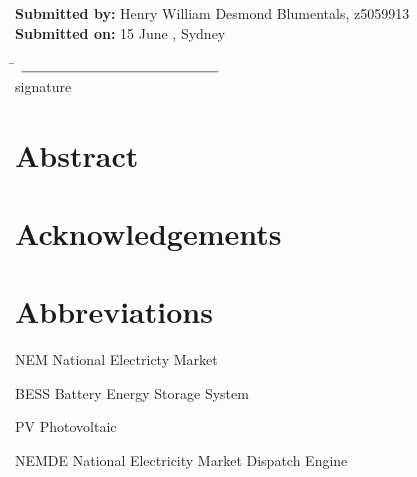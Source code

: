 \documentclass[11pt,fleqn]{book} %
\makeatletter
\newcommand{\tocfill}{\cleaders\hbox{$\m@th \mkern\@dotsep mu . \mkern\@dotsep mu$}\hfill}
\newcommand{\abbrlabel}[1]{\makebox[3cm][l]{\textbf{#1}\ \tocfill}}
\newenvironment{abbreviations}{\begin{list}{}{\renewcommand{\makelabel}{\abbrlabel}%
                                              \setlength{\itemsep}{0pt}}}{\end{list}}
\makeatother
\begin{document}
\noindent
\textbf{Submitted by:} Henry William Desmond Blumentals, z5059913 \\
\textbf{Submitted on:} 15 June \Year, Sydney \\ %

\noindent

\begin{tabbing}
\AuthorName \= $\rule{5cm}{0.15mm}$\\
\> \hspace*{1.5cm} {\footnotesize signature} \\ %
\end{tabbing}
\hspace{3mm}


\clearpage
\thispagestyle{empty}


\chapter*{Abstract}
\chapter*{Acknowledgements}
\chapter*{Abbreviations}
\par\vspace*{-190\p}
\begin{abbreviations}
\item[NEM] National Electricty Market
\item[BESS] Battery Energy Storage System
\item[PV] Photovoltaic
\item[NEMDE] National Electricity Market Dispatch Engine
\end{abbreviations}
\end{document}
